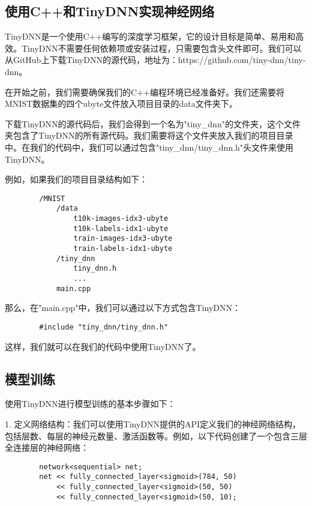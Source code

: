 \documentclass{ctexart}
\begin{document}
    \subsection{使用C++和TinyDNN实现神经网络}
        TinyDNN是一个使用C++编写的深度学习框架，它的设计目标是简单、易用和高效。TinyDNN不需要任何依赖项或安装过程，只需要包含头文件即可。我们可以从GitHub上下载TinyDNN的源代码，地址为：https://github.com/tiny-dnn/tiny-dnn。

        在开始之前，我们需要确保我们的C++编程环境已经准备好。我们还需要将MNIST数据集的四个ubyte文件放入项目目录的data文件夹下。

        下载TinyDNN的源代码后，我们会得到一个名为"tiny\_dnn"的文件夹，这个文件夹包含了TinyDNN的所有源代码。我们需要将这个文件夹放入我们的项目目录中。在我们的代码中，我们可以通过包含"tiny\_dnn/tiny\_dnn.h"头文件来使用TinyDNN。

        例如，如果我们的项目目录结构如下：

        \begin{lstlisting}
        /MNIST
            /data
                t10k-images-idx3-ubyte
                t10k-labels-idx1-ubyte
                train-images-idx3-ubyte
                train-labels-idx1-ubyte
            /tiny_dnn
                tiny_dnn.h
                ...
            main.cpp
        \end{lstlisting}

        那么，在"main.cpp"中，我们可以通过以下方式包含TinyDNN：

        \begin{lstlisting}
        #include "tiny_dnn/tiny_dnn.h"
        \end{lstlisting}

        这样，我们就可以在我们的代码中使用TinyDNN了。

    \subsection{模型训练}
        使用TinyDNN进行模型训练的基本步骤如下：

        1. 定义网络结构：我们可以使用TinyDNN提供的API定义我们的神经网络结构，包括层数、每层的神经元数量、激活函数等。例如，以下代码创建了一个包含三层全连接层的神经网络：

        \begin{lstlisting}
        network<sequential> net;
        net << fully_connected_layer<sigmoid>(784, 50)
            << fully_connected_layer<sigmoid>(50, 50)
            << fully_connected_layer<sigmoid>(50, 10);
        \end{lstlisting}
\end{document}
